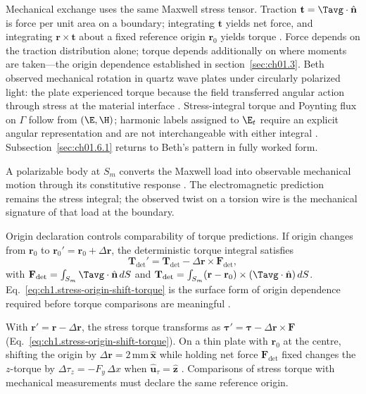 Mechanical exchange uses the same Maxwell stress tensor. Traction $\mathbf{t}=\Tavg\cdot\hat{\mathbf{n}}$ is force per unit area on a boundary; integrating $\mathbf{t}$ yields net force, and integrating $\mathbf{r}\times\mathbf{t}$ about a fixed reference origin $\mathbf{r}_0$ yields torque \cite{maxwell1873,beth1936}. Force depends on the traction distribution alone; torque depends additionally on where moments are taken---the origin dependence established in section~\ref{sec:ch01.3}. Beth \cite{beth1936} observed mechanical rotation in quartz wave plates under circularly polarized light: the plate experienced torque because the field transferred angular action through stress at the material interface \cite{allen1992}. Stress-integral torque and Poynting flux on $\Gamma$ follow from $(\E,\H)$; harmonic labels assigned to $\E_t$ require an explicit angular representation and are not interchangeable with either integral \cite{stratton1941}. Subsection~\ref{sec:ch01.6.1} returns to Beth's pattern in fully worked form.

A polarizable body at $S_m$ converts the Maxwell load into observable mechanical motion through its constitutive response \cite{beth1936,stratton1941}. The electromagnetic prediction remains the stress integral; the observed twist on a torsion wire is the mechanical signature of that load at the boundary.

Origin declaration controls comparability of torque predictions. If origin changes
from \(\mathbf{r}_0\) to \(\mathbf{r}_0'=\mathbf{r}_0+\Delta\mathbf{r}\), the
deterministic torque integral satisfies
\begin{equation}
\label{eq:ch1.stress-origin-shift-torque}
\mathbf{T}_{\mathrm{det}}'
=
\mathbf{T}_{\mathrm{det}}-\Delta\mathbf{r}\times\mathbf{F}_{\mathrm{det}},
\end{equation}
with
\(\mathbf{F}_{\mathrm{det}}=\int_{S_m}\Tavg\cdot\hat{\mathbf{n}}\,dS\) and
\(\mathbf{T}_{\mathrm{det}}=\int_{S_m}(\mathbf{r}-\mathbf{r}_0)\times(\Tavg\cdot\hat{\mathbf{n}})\,dS\).
Eq.~\eqref{eq:ch1.stress-origin-shift-torque} is the surface form of
origin dependence required before torque comparisons are meaningful \cite{stratton1941}.

\begin{example}
\label{ex:ch1.origin-shift}
With $\mathbf{r}'=\mathbf{r}-\Delta\mathbf{r}$, the stress torque transforms as $\boldsymbol{\tau}'=\boldsymbol{\tau}-\Delta\mathbf{r}\times\mathbf{F}$ (Eq.~\eqref{eq:ch1.stress-origin-shift-torque}). On a thin plate with $\mathbf{r}_0$ at the centre, shifting the origin by $\Delta\mathbf{r}=2\,\mathrm{mm}\,\hat{\mathbf{x}}$ while holding net force $\mathbf{F}_{\mathrm{det}}$ fixed changes the $z$-torque by $\Delta\tau_z=-F_y\,\Delta x$ when $\hat{\mathbf{u}}_\tau=\hat{\mathbf{z}}$ \cite{stratton1941}. Comparisons of stress torque with mechanical measurements must declare the same reference origin.
\end{example}

